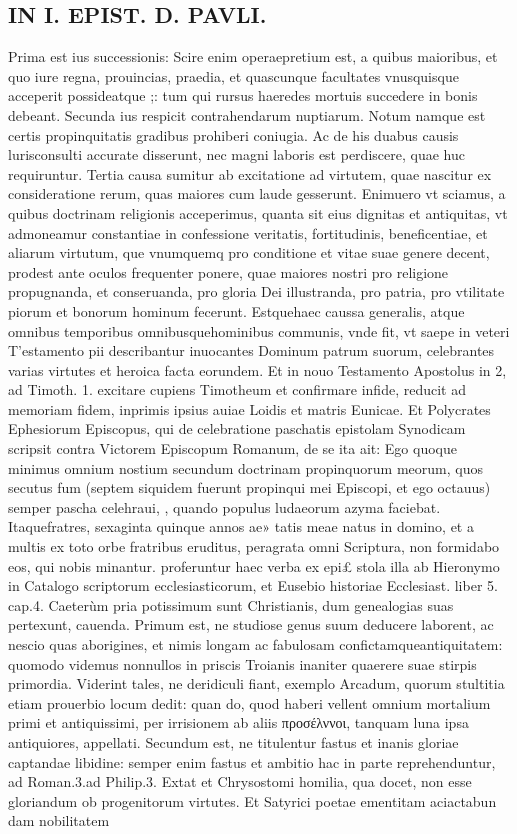 \documentclass{article}
\begin{document}
\begin{pages}
\section*{IN I. EPIST. D. PAVLI. }
\marginpar{[ p.15 ]}\pstart Prima est ius successionis: Scire enim operaepretium est, a quibus maioribus, et quo iure regna, prouincias, praedia, et quascunque  facultates vnusquisque  acceperit possideatque ;: tum qui rursus haeredes mortuis succedere in bonis debeant.  \pend\pstart Secunda ius respicit contrahendarum nuptiarum. Notum namque  est certis propinquitatis gradibus prohiberi coniugia. Ac de his duabus causis lurisconsulti accurate disserunt, nec magni laboris est perdiscere, quae huc requiruntur.  \pend\pstart Tertia causa sumitur ab excitatione ad virtutem, quae nascitur ex consideratione rerum, quas maiores cum laude gesserunt. Enimuero vt sciamus, a quibus doctrinam religionis acceperimus, quanta sit eius dignitas et antiquitas, vt admoneamur constantiae in confessione veritatis, fortitudinis, beneficentiae, et aliarum virtutum, que vnumquemq pro conditione et vitae suae genere decent, prodest ante oculos frequenter ponere, quae maiores nostri pro religione propugnanda, et conseruanda, pro gloria Dei illustranda, pro patria, pro vtilitate piorum et bonorum hominum fecerunt. Estquehaec caussa generalis, atque  omnibus temporibus omnibusquehominibus communis, vnde fit, vt saepe in veteri T’estamento pii describantur inuocantes Dominum patrum suorum, celebrantes varias virtutes et heroica facta eorundem. Et in nouo Testamento Apostolus in 2, ad Timoth. 1. excitare cupiens Timotheum et confirmare infide, reducit ad memoriam fidem, inprimis ipsius auiae Loidis et matris Eunicae. Et Polycrates Ephesiorum Episcopus, qui de celebratione paschatis epistolam Synodicam scripsit contra Victorem Episcopum Romanum, de se ita ait: Ego quoque minimus omnium nostium secundum doctrinam propinquorum meorum, quos secutus fum (septem siquidem fuerunt propinqui mei Episcopi, et ego octauus) semper pascha celehraui, , quando populus ludaeorum azyma faciebat. Itaquefratres, sexaginta quinque  annos ae» tatis meae natus in domino, et a multis ex toto orbe fratribus eruditus, peragrata omni Scriptura, non formidabo eos, qui nobis minantur. proferuntur haec verba ex epi£ stola illa ab Hieronymo in Catalogo scriptorum ecclesiasticorum, et Eusebio historiae Ecclesiast. liber 5. cap.4.  \pend\pstart Caeterùm pria potissimum sunt Christianis, dum genealogias suas pertexunt, cauenda. Primum est, ne studiose genus suum deducere laborent, ac nescio quas aborigines, et nimis longam ac fabulosam confictamqueantiquitatem: quomodo videmus nonnullos in priscis Troianis inaniter quaerere suae stirpis primordia. Viderint tales, ne deridiculi fiant, exemplo Arcadum, quorum stultitia etiam prouerbio locum dedit: quan do, quod haberi vellent omnium mortalium primi et antiquissimi, per irrisionem ab aliis προσέλννοι, tanquam luna ipsa antiquiores, appellati. Secundum est, ne titulentur fastus et inanis gloriae captandae libidine: semper enim fastus et ambitio hac in parte reprehenduntur, ad Roman.3.ad Philip.3. Extat et Chrysostomi homilia, qua docet, non esse gloriandum ob progenitorum virtutes. Et Satyrici poetae ementitam aciactabun dam nobilitatem 
\end{pages}
\end{document}
